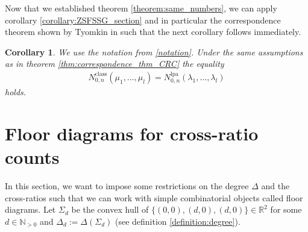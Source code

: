 \documentclass[11pt,reqno,a4]{amsart}
\theoremstyle{dotless}
\newtheorem{corollary}{Corollary}[section]
\theoremstyle{definition}
\begin{document}
Now that we established theorem \ref{theorem:same_numbers}, we can apply corollary \ref{corollary:ZSFSSG_section} and in particular the correspondence theorem shown by Tyomkin in \cite{IlyaCRC} such that the next corollary follows immediately.


\begin{corollary}
We use the notation from \ref{notation}. Under the same assumptions as in theorem \ref{thm:correspondence_thm_CRC} the equality
\begin{align*}
N^{\textrm{class}}_{0,n}\left( \mu_1,\dots,\mu_l \right)
=
N_{0,n}^{\textrm{lpa}}\left(\lambda_1,\dots,\lambda_l\right)
\end{align*}
holds.
\end{corollary}



\section{Floor diagrams for cross-ratio counts}\label{section:special_case:floor_diagrams_cross-ratios}

In this section, we want to impose some restrictions on the degree $\Delta$ and the cross-ratios such that we can work with simple combinatorial objects called floor diagrams. Let $\Sigma_d$ be the convex hull of $\lbrace (0,0),(d,0),(d,0)\rbrace\in\mathbb{R}^2$ for some $d\in\mathbb{N}_{>0}$ and $\Delta_d:=\Delta\left(\Sigma_d\right)$ (see definition \ref{definition:degree}).
\end{document}
